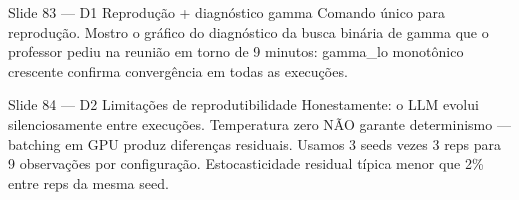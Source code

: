 \documentclass[aspectratio=169,10pt]{beamer}
\begin{document}
\begin{frame}{Slide 83 --- D1 Reprodu\c{c}\~ao + diagn\'ostico gamma}
\footnotesize
Comando \'unico para reprodu\c{c}\~ao. Mostro o gr\'afico do diagn\'ostico da busca bin\'aria de gamma que o professor pediu na reuni\~ao em torno de 9 minutos: gamma\_lo monot\^onico crescente confirma converg\^encia em todas as execu\c{c}\~oes.
\end{frame}

\begin{frame}{Slide 84 --- D2 Limita\c{c}\~oes de reprodutibilidade}
\footnotesize
Honestamente: o LLM evolui silenciosamente entre execu\c{c}\~oes. Temperatura zero N\~AO garante determinismo --- batching em GPU produz diferen\c{c}as residuais. Usamos 3 seeds vezes 3 reps para 9 observa\c{c}\~oes por configura\c{c}\~ao. Estocasticidade residual t\'ipica menor que 2\% entre reps da mesma seed.
\end{frame}
\end{document}
